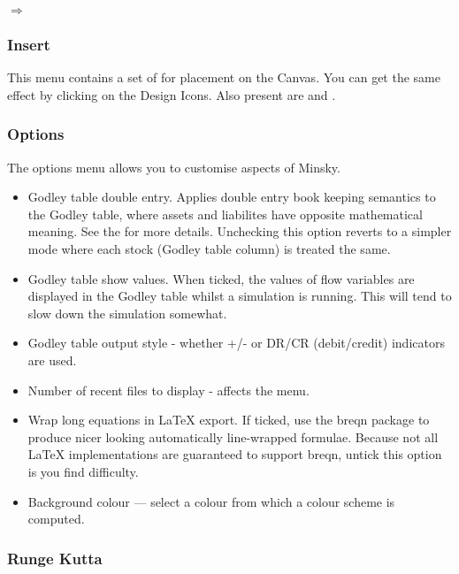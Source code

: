  $\Rightarrow$ 

\subsubsection{Insert}
\label{Insert}

This menu contains a set of  for placement on the Canvas. You can get the same
effect by clicking on the Design Icons. Also present are
 and .


\subsubsection{Options}
\label{Options}

The options menu allows you to customise aspects of Minsky.

\begin{itemize}
\item Godley table double entry. Applies double entry book keeping
semantics to the Godley table, where assets and liabilites have
opposite mathematical meaning. See the  for more details. Unchecking this option reverts to a
simpler mode where each stock (Godley table column) is treated the
same.
\item Godley table show values. When ticked, the values of flow
variables are displayed in the Godley table whilst a simulation is
running. This will tend to slow down the simulation somewhat.
\item Godley table output style - whether +/- or DR/CR (debit/credit)
indicators are used.
\item Number of recent files to display - affects the  menu.
\item\label{wrap-equations} Wrap long equations in LaTeX export. If ticked, use the breqn
package to produce nicer looking automatically line-wrapped
formulae. Because not all LaTeX implementations are guaranteed to
support breqn, untick this option is you find difficulty.
\item Background colour --- select a colour from which a colour scheme
is computed.
\end{itemize}

\subsubsection{Runge Kutta}
\label{RungeKutta}

